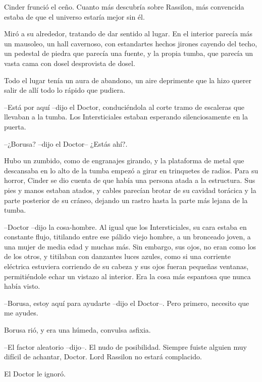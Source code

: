 Cinder frunció el ceño. Cuanto más descubría sobre Rassilon, más convencida estaba de que el universo estaría mejor sin él.

Miró a su alrededor, tratando de dar sentido al lugar. En el interior parecía más un mausoleo, un hall cavernoso, con estandartes hechos jirones cayendo del techo, un pedestal de piedra que parecía una fuente, y la propia tumba, que parecía un vasta cama con dosel desprovista de dosel.

Todo el lugar tenía un aura de abandono, un aire deprimente que la hizo querer salir de allí todo lo rápido que pudiera.



--Está por aquí --dijo el Doctor, conduciéndola al corte tramo de escaleras que llevaban a la tumba. Los Intersticiales estaban esperando silenciosamente en la puerta.

--¿Borusa? --dijo el Doctor-- ¿Estás ahí?.



Hubo un zumbido, como de engranajes girando, y la plataforma de metal que descansaba en lo alto de la tumba empezó a girar en trinquetes de radios. Para su horror, Cinder se dio cuenta de que había una persona atada a la estructura. Sus pies y manos estaban atados, y cables parecían brotar de su cavidad torácica y la parte posterior de su cráneo, dejando un rastro hasta la parte más lejana de la tumba.



--Doctor --dijo la cosa-hombre. Al igual que los Intersticiales, su cara estaba en constante flujo, titilando entre ese pálido viejo hombre, a un bronceado joven, a una mujer de media edad y muchas más. Sin embargo, sus ojos, no eran como los de los otros, y titilaban con danzantes luces azules, como si una corriente eléctrica estuviera corriendo de su cabeza y sus ojos fueran pequeñas ventanas, permitiéndole echar un vistazo al interior. Era la cosa más espantosa que nunca había visto.

--Borusa, estoy aquí para ayudarte --dijo el Doctor--. Pero primero, necesito que me ayudes.



Borusa rió, y era una húmeda, convulsa asfixia.



--El factor aleatorio --dijo--. El nudo de posibilidad. Siempre fuiste alguien muy difícil de achantar, Doctor. Lord Rassilon no estará complacido.



El Doctor le ignoró. 



